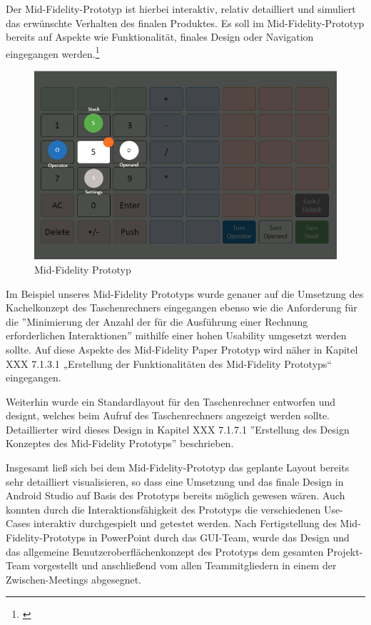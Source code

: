 Der Mid-Fidelity-Prototyp ist hierbei interaktiv, relativ detailliert und simuliert das erwünschte Verhalten des finalen Produktes. Es soll im Mid-Fidelity-Prototyp bereits auf Aspekte wie Funktionalität, finales Design oder Navigation eingegangen werden.\footnote{\cite[vgl.][S.~204]{jhammondtgrossjwesson2002}}


\begin{figure}[!h]
	\includegraphics[width=1\columnwidth]{img/planung-mid-fidelity}
	\caption[Mid-Fidelity Prototyp]{Mid-Fidelity Prototyp\footnotemark}
\end{figure}


Im Beispiel unseres Mid-Fidelity Prototyps wurde genauer auf die Umsetzung des Kachelkonzept des Taschenrechners eingegangen ebenso wie die Anforderung für die ''Minimierung der Anzahl der für die Ausführung einer Rechnung erforderlichen Interaktionen'' mithilfe einer hohen Usability umgesetzt werden sollte. Auf diese Aspekte des Mid-Fidelity Paper Prototyp wird näher in Kapitel XXX 7.1.3.1	„Erstellung der Funktionalitäten des Mid-Fidelity Prototyps“ eingegangen. 

Weiterhin wurde ein Standardlayout für den Taschenrechner entworfen und designt, welches beim Aufruf des Taschenrechners angezeigt werden sollte. Detaillierter wird dieses Design in Kapitel XXX 7.1.7.1	''Erstellung des Design Konzeptes des Mid-Fidelity Prototyps'' beschrieben. 

Insgesamt ließ sich bei dem Mid-Fidelity-Prototyp das geplante Layout bereits sehr detailliert visualisieren, so dass eine Umsetzung und das finale Design in Android Studio auf Basis des Prototyps bereits möglich gewesen wären. Auch konnten durch die Interaktionsfähigkeit des Prototyps die verschiedenen Use-Cases interaktiv durchgespielt und getestet werden. Nach Fertigstellung des Mid-Fidelity-Prototyps in PowerPoint durch das GUI-Team, wurde das Design und das allgemeine Benutzeroberflächenkonzept des Prototyps dem gesamten Projekt-Team vorgestellt und anschließend vom allen Teammitgliedern in einem der Zwischen-Meetings abgesegnet. 

